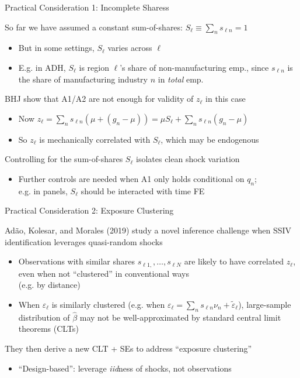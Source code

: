 \documentclass{beamer}
\begin{document}
\begin{frame}{Practical Consideration 1: Incomplete Sharess}


So far we have assumed a constant sum-of-shares: $S_\ell\equiv\sum_n s_{\ell n}=1$\smallskip
\begin{itemize}
\item But in some settings, $S_\ell$ varies across $\ell$\smallskip
\item E.g. in ADH, $S_\ell$ is region $\ell$'s share of non-manufacturing emp., since $s_{\ell n}$ is the share of manufacturing industry $n$ in \emph{total} emp.
\end{itemize}\bigskip\pause{}
 BHJ show that A1/A2 are not enough for validity of $z_\ell$ in this case\smallskip
\begin{itemize}
\item Now $z_\ell=\sum_n s_{\ell n}\left(\mu+(g_n-\mu)\right)=\mu S_\ell+\sum_n s_{\ell n}(g_n-\mu)$\smallskip
\item So $z_\ell$ is mechanically correlated with $S_\ell$, which may be endogenous 
\end{itemize}\bigskip\pause{}
 Controlling for the sum-of-shares $S_\ell$ isolates clean shock variation\smallskip
\begin{itemize}
\item Further controls are needed when A1 only holds conditional on $q_n$; \\ e.g. in panels, $S_\ell$ should be interacted with time FE
\end{itemize}
\end{frame}

\begin{frame}{Practical Consideration 2: Exposure Clustering}

 Ad\~{a}o, Kolesar, and Morales (2019) study a novel inference challenge when SSIV identification leverages quasi-random shocks \smallskip
\begin{itemize}
\item Observations with similar shares $s_{\ell 1,},\dots,s_{\ell N}$ are likely to have correlated $z_\ell$, even when not ``clustered'' in conventional ways \\ (e.g. by distance)\smallskip
\item When $\varepsilon_\ell$ is similarly clustered (e.g. when $\varepsilon_\ell=\sum_n s_{\ell n}\nu_n +\tilde{\varepsilon}_\ell$), large-sample distribution of $\hat{\beta}$ may not be well-approximated by standard central limit theorems (CLTs)
\end{itemize}\medskip\pause{}
They then derive a new CLT + SEs to address ``exposure clustering''\medskip
	\begin{itemize}
	\item ``Design-based'': leverage \emph{iid}ness of shocks, not observations
	\end{itemize}
\end{frame}
\end{document}
